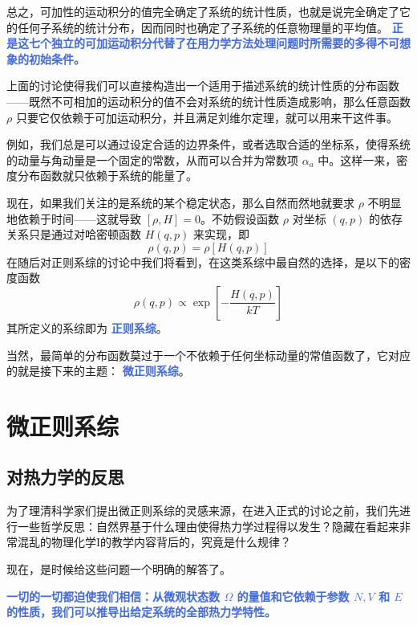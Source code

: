 总之，可加性的运动积分的值完全确定了系统的统计性质，也就是说完全确定了它的任何子系统的统计分布，因而同时也确定了子系统的任意物理量的平均值。 \textcolor{RoyalBlue}{\textbf{\kaishu 正是这七个独立的可加运动积分代替了在用力学方法处理问题时所需要的多得不可想象的初始条件。}}

上面的讨论使得我们可以直接构造出一个适用于描述系统的统计性质的分布函数——既然不可相加的运动积分的值不会对系统的统计性质造成影响，那么任意函数 $\rho$ 只要它仅依赖于可加运动积分，并且满足刘维尔定理，就可以用来干这件事。

例如，我们总是可以通过设定合适的边界条件，或者选取合适的坐标系，使得系统的动量与角动量是一个固定的常数，从而可以合并为常数项 $\alpha_a$ 中。这样一来，密度分布函数就只依赖于系统的能量了。

现在，如果我们关注的是系统的某个稳定状态，那么自然而然地就要求 $\rho$ 不明显地依赖于时间——这就导致 $[\rho, H] = 0$。不妨假设函数 $\rho$ 对坐标 $(q,p)$ 的依存关系只是通过对哈密顿函数 $H(q,p)$ 来实现，即
\begin{equation}
    \rho(q,p) = \rho[H(q,p)]
\end{equation} 
在随后对正则系综的讨论中我们将看到，在这类系综中最自然的选择，是以下的密度函数
\begin{equation}
    \rho(q, p) \propto \exp \left[-\frac{H(q, p)}{k T}\right]
\end{equation}
其所定义的系综即为 \textcolor{RoyalBlue}{\textbf{\kaishu 正则系综}}。

当然，最简单的分布函数莫过于一个不依赖于任何坐标动量的常值函数了，它对应的就是接下来的主题： \textcolor{RoyalBlue}{\textbf{\kaishu 微正则系综}}。



\section{微正则系综}\label{sec:微正则系综}

\subsection{对热力学的反思}

为了理清科学家们提出微正则系综的灵感来源，在进入正式的讨论之前，我们先进行一些哲学反思：自然界基于什么理由使得热力学过程得以发生？隐藏在看起来非常混乱的物理化学I的教学内容背后的，究竟是什么规律？

现在，是时候给这些问题一个明确的解答了。

\textcolor{RoyalBlue}{\textbf{\kaishu 一切的一切都迫使我们相信：从微观状态数 $\Omega$ 的量值和它依赖于参数 $N,V$ 和 $E$ 的性质，我们可以推导出给定系统的全部热力学特性。}}

